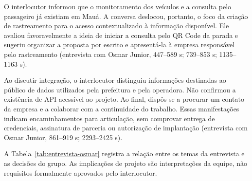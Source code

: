 \documentclass[12pt,oneside,a4paper,brazil,chapter=TITLE]{abntex2}
\begin{document}
O interlocutor informou que o monitoramento dos veículos e a consulta pelo passageiro já existiam em Mauá. A conversa deslocou, portanto, o foco da criação de rastreamento para o acesso contextualizado à informação disponível. Ele avaliou favoravelmente a ideia de iniciar a consulta pelo QR Code da parada e sugeriu organizar a proposta por escrito e apresentá-la à empresa responsável pelo rastreamento  (entrevista com Osmar Junior, 447--589 s; 739--853 s; 1135--1163 s).

Ao discutir integração, o interlocutor distinguiu informações destinadas ao público de dados utilizados pela prefeitura e pela operadora. Não confirmou a existência de API acessível ao projeto. Ao final, dispôs-se a procurar um contato da empresa e a colaborar com a continuidade do trabalho. Essas manifestações indicam encaminhamentos para articulação, sem comprovar entrega de credenciais, assinatura de parceria ou autorização de implantação  (entrevista com Osmar Junior, 861--919 s; 2293--2425 s).

A Tabela~\ref{tab:entrevista-osmar} registra a relação entre os temas da entrevista e as decisões do grupo. As implicações de projeto são interpretações da equipe, não requisitos formalmente aprovados pelo interlocutor.
\end{document}
